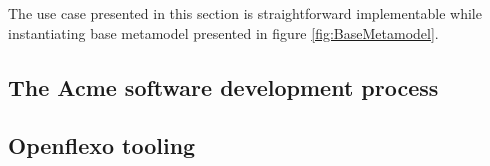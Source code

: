 The use case presented in this section is straightforward implementable while instantiating base metamodel presented in figure \ref{fig:BaseMetamodel}.



\subsection{The Acme software development process}

\subsection{Openflexo tooling}



